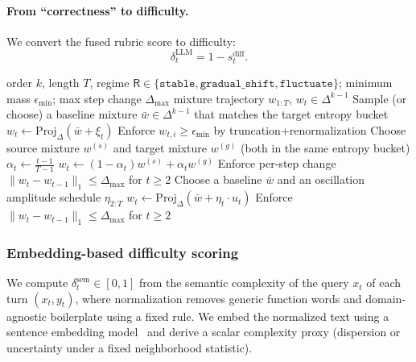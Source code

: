 \paragraph{From ``correctness'' to difficulty.}
We convert the fused rubric score to difficulty:
\begin{equation}
\label{eq:diff_llm_to_delta}
\delta^{\text{LLM}}_t = 1 - s^{\text{diff}}_{t}.
\end{equation}

\begin{algorithm}[ht]
\caption{Mixture-trajectory sampler (implementation-agnostic)}
\label{alg:mixture_sampler}
\begin{algorithmic}[1]
\Require order $k$, length $T$, regime $\mathsf{R}\in\{\texttt{stable},\texttt{gradual\_shift},\texttt{fluctuate}\}$;
minimum mass $\epsilon_{\min}$; max step change $\Delta_{\max}$
\Ensure mixture trajectory $w_{1:T}$, $w_t\in\Delta^{k-1}$
\State Sample (or choose) a baseline mixture $\bar{w}\in\Delta^{k-1}$ that matches the target entropy bucket
        \State $w_t \leftarrow \mathrm{Proj}_\Delta(\bar{w} + \xi_t)$ 
        \State Enforce $w_{t,i}\ge \epsilon_{\min}$ by truncation+renormalization
    \EndFor
{}
    \State Choose source mixture $w^{(s)}$ and target mixture $w^{(g)}$ (both in the same entropy bucket)
        \State $\alpha_t \leftarrow \frac{t-1}{T-1}$
        \State $w_t \leftarrow (1-\alpha_t)w^{(s)} + \alpha_t w^{(g)}$
        \State Enforce per-step change $\|w_t-w_{t-1}\|_1 \le \Delta_{\max}$ for $t\ge2$
    \EndFor
{}
    \State Choose a baseline $\bar{w}$ and an oscillation amplitude schedule $\eta_{2:T}$
        \State $w_t \leftarrow \mathrm{Proj}_\Delta(\bar{w} + \eta_t \cdot u_t)$ 
        \State Enforce $\|w_t-w_{t-1}\|_1 \le \Delta_{\max}$ for $t\ge2$
    \EndFor
\EndIf
\end{algorithmic}
\end{algorithm}

\subsubsection{Embedding-based difficulty scoring}
\label{app:difficulty_sem}

We compute $\delta^{\text{sem}}_t\in[0,1]$ from the semantic complexity of the query $x_t$ of each turn $(x_t,y_t)$, where normalization removes generic function words and domain-agnostic boilerplate using a fixed rule. We embed the normalized text using a sentence embedding model~\citep{reimers-gurevych-2019-sentence} and derive a scalar complexity proxy (dispersion or uncertainty under a fixed neighborhood statistic).


